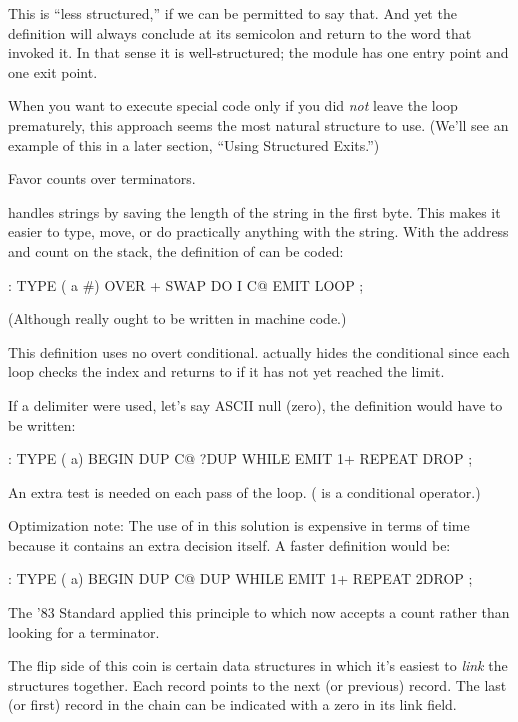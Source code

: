 This is ``less structured,'' if we can be permitted to say that. And
yet the definition will always conclude at its semicolon and return to the
word that invoked it. In that sense it is well-structured; the module has
one entry point and one exit point.

When you want to execute special code only if you did \emph{not} leave the
loop prematurely, this approach seems the most natural structure to use.
(We'll see an example of this in a later section, ``Using Structured
Exits.'')
%
\begin{tip}
Favor counts over terminators.
\end{tip}
\Forth{} handles strings by saving the length of the string in the first
byte. This makes it easier to type, move, or do practically anything with
the string. With the address and count on the stack, the definition of
 can be coded:

\begin{Code}
: TYPE  ( a #)  OVER + SWAP DO  I C@ EMIT  LOOP ;
\end{Code}
(Although  really ought to be written in machine code.)

This definition uses no overt conditional.  actually hides the
conditional since each loop checks the index and returns to  if it
has not yet reached the limit.

If a delimiter were used, let's say ASCII null (zero), the definition
would have to be written:

\begin{Code}
: TYPE  ( a)  BEGIN DUP C@  ?DUP WHILE  EMIT  1+
   REPEAT  DROP ;
\end{Code}
An extra test is needed on each pass of the loop. ( is a
conditional operator.)

Optimization note: The use of  in this solution is expensive
in terms of time because it contains an extra decision itself. A faster
definition would be:

\begin{Code}
: TYPE  ( a)  BEGIN DUP C@  DUP WHILE EMIT 1+
    REPEAT  2DROP ;
\end{Code}
The '83 Standard applied this principle to 
which now accepts a count rather than looking for a terminator.

The flip side of this coin is certain data structures in which it's
easiest to \emph{link} the structures together. Each record points to the
next (or previous) record. The last (or first) record in the chain can be
indicated with a zero in its link field.

